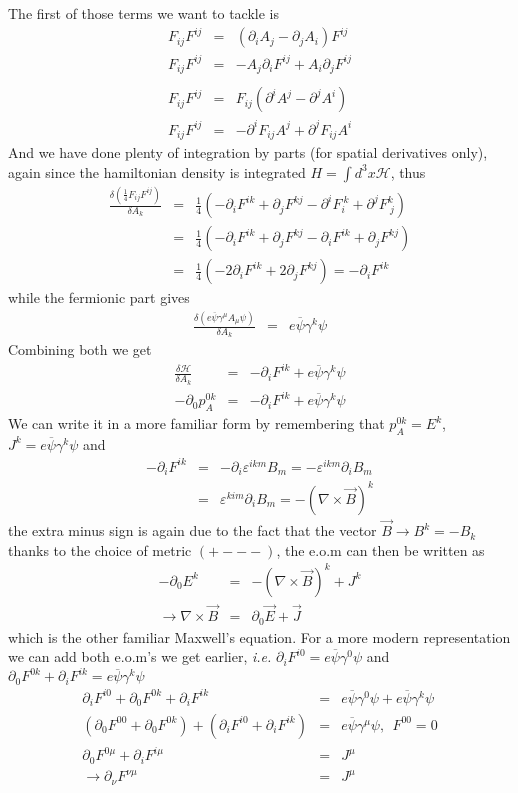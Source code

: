 \documentclass[aps,preprint,preprintnumbers,nofootinbib,showpacs,prd]{revtex4-1}
\newcommand{\ie}{{\it i.e.} }
\newcommand{\nbea}{\begin{eqnarray*}}
\newcommand{\neea}{\end{eqnarray*}}
\begin{document}
The first of those terms we want to tackle is
%
\nbea
F_{ij} F^{ij} & = & (\partial_i A_j - \partial_j A_i)F^{ij} \\
F_{ij} F^{ij} & = &  -A_j \partial_i F^{ij} + A_i \partial_j F^{ij} \\ \\
F_{ij} F^{ij} & = & F_{ij}(\partial^i A^j - \partial^j A^i) \\
F_{ij} F^{ij} & = &  - \partial^i F_{ij} A^j + \partial^j F_{ij} A^i
\neea
%
And we have done plenty of integration by parts (for spatial derivatives only), again since the hamiltonian density is integrated $H = \int d^3x \mathcal{H}$, thus
%
\nbea
\frac{\delta \left ( \frac{1}{4}F_{ij} F^{ij} \right )}{\delta A_k} & = & \frac{1}{4} \left (- \partial_i F^{ik} + \partial_j F^{kj}  - \partial^i F_{i}^{\ k} + \partial^j F_{\ j}^k \right )\\
& = & \frac{1}{4} \left (- \partial_i F^{ik} + \partial_j F^{kj}  - \partial_i F^{ik} + \partial_j F^{kj} \right )\\
& = & \frac{1}{4} \left (- 2\partial_i F^{ik} + 2\partial_j F^{kj} \right )= - \partial_i F^{ik}
\neea
%
while the fermionic part gives
%
\nbea
\frac{\delta (e \overline \psi \gamma^\mu A_\mu \psi) } {\delta A_k} & = & e \overline \psi \gamma^k \psi 
\neea
%
Combining both we get
%
\nbea
\frac{\delta \mathcal{H}}{\delta A_k} & = & - \partial_i F^{ik} + e \overline \psi \gamma^k \psi \\
-\partial_0 p_A^{0k} & = & - \partial_i F^{ik} + e \overline \psi \gamma^k \psi
\neea
%
We can write it in a more familiar form by remembering that $p_A^{0k} = E^k$, $J^k = e \overline \psi \gamma^k \psi$ and 
%
\nbea
-\partial_i F^{ik} & = & -\partial_i \varepsilon^{ikm} B_m = -\varepsilon^{ikm} \partial_i B_m \\
& = & \varepsilon^{kim} \partial_i B_m  = -(\nabla \times \vec B)^k
\neea
%
the extra minus sign is again due to the fact that the vector $\vec B \rightarrow B^k = - B_k$ thanks to the choice of metric $(+ - - -)$, the e.o.m can then be written as
%
\nbea
-\partial_0 E^{k} & = & -(\nabla \times \vec B)^k + J^k \\
\rightarrow \nabla \times \vec B & = & \partial_0 \vec E + \vec J
\neea
%
which is the other familiar Maxwell's equation. For a more modern representation we can add both e.o.m's we get earlier, \ie $\partial_i F^{i 0} = e \overline \psi \gamma^0 \psi $ and $ \partial_0 F^{0 k} + \partial_i F^{ik} = e \overline \psi \gamma^k \psi$ 
%
\nbea
\partial_i F^{i 0} + \partial_0 F^{0 k} + \partial_i F^{ik} & = & e \overline \psi \gamma^0 \psi + e \overline \psi \gamma^k \psi\\
(\partial_0 F^{0 0} + \partial_0 F^{0 k}) + ( \partial_i F^{i 0} + \partial_i F^{ik}) & = & e \overline \psi \gamma^\mu \psi, ~~F^{00} = 0 \\
\partial_0 F^{0\mu} + \partial_i F^{i \mu} & = & J^\mu \\
\rightarrow \partial_\nu F^{\nu\mu} & = & J^\mu
\neea
%
\end{document}
